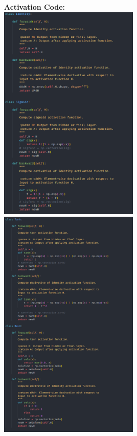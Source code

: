 \documentclass{article}[12pt]
\begin{document}
\textbf{Activation Code:}\\
\includegraphics[width=0.5\textwidth]{ActivationCode1.png}
\includegraphics[width=0.5\textwidth]{ActivationCode2.png}\\
\end{document}
